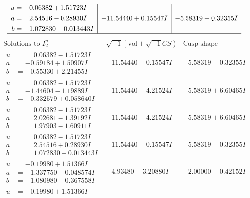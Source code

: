 \documentclass[1p]{elsarticle_modified}
\theoremstyle{definition}
\newcommand{\I}{\sqrt{-1}}
\begin{document}
$$\begin{array}{c|c|c}
\begin{aligned}
u &= \phantom{-}0.06382 + 1.51723 I \\
a &= \phantom{-}2.54516 - 0.28930 I \\
b &= \phantom{-}1.072830 + 0.013443 I\end{aligned}
 & -11.54440 + 0.15547 I & -5.58319 + 0.32355 I\\
 \hline 
 \end{array}$$\newpage$$\begin{array}{c|c|c}  
\text{Solutions to }I^u_{2}& \I (\text{vol} + \sqrt{-1}CS) & \text{Cusp shape}\\
 \hline 
\begin{aligned}
u &= \phantom{-}0.06382 - 1.51723 I \\
a &= -0.59184 + 1.50907 I \\
b &= -0.55330 + 2.21455 I\end{aligned}
 & -11.54440 - 0.15547 I & -5.58319 - 0.32355 I \\ \hline\begin{aligned}
u &= \phantom{-}0.06382 - 1.51723 I \\
a &= -1.44604 - 1.19889 I \\
b &= -0.332579 + 0.058640 I\end{aligned}
 & -11.54440 - 4.21524 I & -5.58319 + 6.60465 I \\ \hline\begin{aligned}
u &= \phantom{-}0.06382 - 1.51723 I \\
a &= \phantom{-}2.02681 - 1.39192 I \\
b &= \phantom{-}1.97903 - 1.60911 I\end{aligned}
 & -11.54440 - 4.21524 I & -5.58319 + 6.60465 I \\ \hline\begin{aligned}
u &= \phantom{-}0.06382 - 1.51723 I \\
a &= \phantom{-}2.54516 + 0.28930 I \\
b &= \phantom{-}1.072830 - 0.013443 I\end{aligned}
 & -11.54440 - 0.15547 I & -5.58319 - 0.32355 I \\ \hline\begin{aligned}
u &= -0.19980 + 1.51366 I \\
a &= -1.337750 - 0.048574 I \\
b &= -1.080980 - 0.367558 I\end{aligned}
 & -4.93480 - 3.20880 I & -2.00000 - 0.42152 I \\ \hline\begin{aligned}
u &= -0.19980 + 1.51366 I \\

\end{aligned}
\end{array}$$
\end{document}

